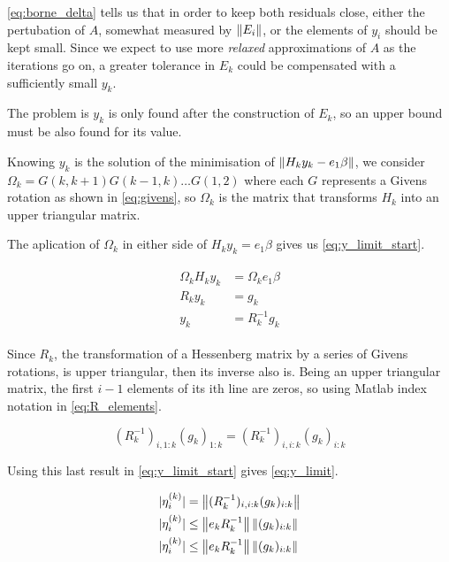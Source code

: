 \ref{eq:borne_delta} tells us that in order to keep both residuals close, either the pertubation of $A$, somewhat measured by $\left\lVert E_{i}\right\rVert$, or the elements of $y_{i}$ should be kept small. Since we expect to use more \textit{relaxed} approximations of $A$ as the iterations go on, a greater tolerance in $E_{k}$ could be compensated with a sufficiently small $y_{k}$.


The problem is $y_{k}$ is only found after the construction of $E_{k}$, so an upper bound must be also found for its value.

Knowing $y_{k}$ is the solution of the minimisation of $ \left\lVert H_{k}y_{k} - e_{1}\beta\right\rVert $, we consider $\Omega_{k} =G(k,k+1) G(k-1,k) \dots G(1,2)$ where each $G$ represents a Givens rotation as shown in \ref{eq:givens}, so $\Omega_{k}$ is the matrix that transforms $H_{k}$ into an upper triangular matrix.

The aplication of $\Omega_{k}$ in either side of $H_{k}y_{k}  = e_{1}\beta$ gives us \ref{eq:y_limit_start}.

\begin{align}\label{eq:y_limit_start}
    \begin{split}
        \Omega_{k}H_{k}y_{k}&=\Omega_{k}e_{1}\beta\\
        R_{k}y_{k}&=g_{k}\\
        y_{k}&=R^{-1}_{k}g_{k}
    \end{split}
\end{align}

Since $R_{k}$, the transformation of a Hessenberg matrix by a series of Givens rotations, is upper triangular, then its inverse also is.
Being an upper triangular matrix, the first $i-1$ elements of its ith line are zeros, so using Matlab index notation in \ref{eq:R_elements}.

\begin{equation}\label{eq:R_elements}
    (R^{-1}_{k})_{i,1:k}(g_{k})_{1:k} = (R^{-1}_{k})_{i,i:k}(g_{k})_{i:k}
\end{equation}

Using this last result in \ref{eq:y_limit_start} gives \ref{eq:y_limit}.

\begin{align}\label{eq:y_limit}
    \begin{split}
        |\eta^{(k)}_{i}| &= \left\lVert(R^{-1}_{k})_{i,i:k}(g_{k})_{i:k}\right\rVert\\
        |\eta^{(k)}_{i}| &\leq \left\lVert e_{k}R^{-1}_{k}\right\rVert \left\lVert(g_{k})_{i:k}\right\rVert\\
        |\eta^{(k)}_{i}| &\leq \left\lVert e_{k}R^{-1}_{k}\right\rVert \left\lVert(g_{k})_{i:k}\right\rVert\\
    \end{split}
\end{align}

